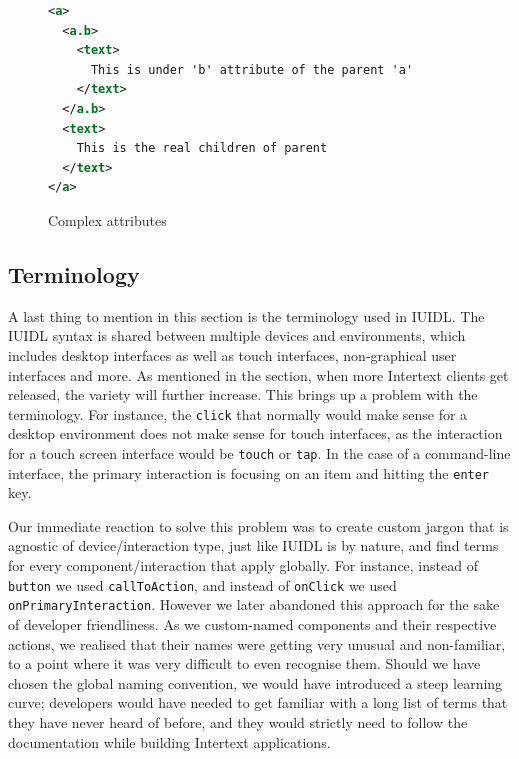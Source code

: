\begin{figure}
\begin{minipage}{\linewidth}
\begin{lstlisting}[language=xml]
<a>
  <a.b>
    <text>
      This is under 'b' attribute of the parent 'a'
    </text>
  </a.b>
  <text>
    This is the real children of parent
  </text>
</a>
\end{lstlisting}
\end{minipage}
\caption{Complex attributes}%
\label{fig:complex_attributes}%
\end{figure}


\subsection{Terminology}

A last thing to mention in this section is the terminology used in IUIDL. The IUIDL syntax is shared between multiple devices and environments, which includes desktop interfaces as well as touch interfaces, non-graphical user interfaces and more. As mentioned in the  section, when more Intertext clients get released, the variety will further increase. This brings up a problem with the terminology. For instance, the \texttt{click} that normally would make sense for a desktop environment does not make sense for touch interfaces, as the interaction for a touch screen interface would be \texttt{touch} or \texttt{tap}. In the case of a command-line interface, the primary interaction is focusing on an item and hitting the \texttt{enter} key. 

Our immediate reaction to solve this problem was to create custom jargon that is agnostic of device/interaction type, just like IUIDL is by nature, and find terms for every component/interaction that apply globally. For instance, instead of \texttt{button} we used \texttt{callToAction}, and instead of \texttt{onClick} we used \texttt{onPrimaryInteraction}. However we later abandoned this approach for the sake of developer friendliness. As we custom-named components and their respective actions, we realised that their names were getting very unusual and non-familiar, to a point where it was very difficult to even recognise them. Should we have chosen the global naming convention, we would have introduced a steep learning curve; developers would have needed to get familiar with a long list of terms that they have never heard of before, and they would strictly need to follow the documentation while building Intertext applications.


